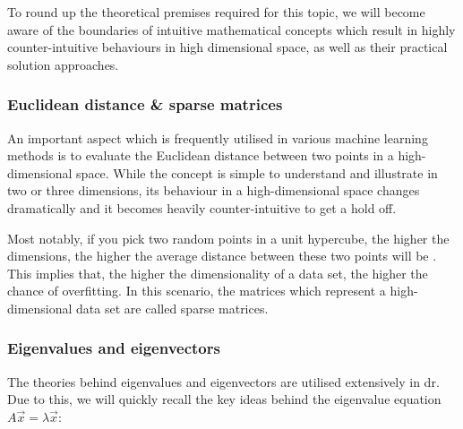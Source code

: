 
To round up the theoretical premises required for this topic, we will become aware of the boundaries of intuitive mathematical concepts which result in highly counter-intuitive behaviours in high dimensional space, as well as their practical solution approaches.

\subsubsection{Euclidean distance \& sparse matrices}

An important aspect which is frequently utilised in various machine learning methods is to evaluate the Euclidean distance between two points in a high-dimensional space.
While the concept is simple to understand and illustrate in two or three dimensions, its behaviour in a high-dimensional space changes dramatically and it becomes heavily counter-intuitive to get a hold off.

Most notably, if you pick two random points in a unit hypercube, the higher the dimensions, the higher the average distance between these two points will be \cite{HandsOnMLCh8}.
This implies that, the higher the dimensionality of a data set, the higher the chance of overfitting.
In this scenario, the matrices which represent a high-dimensional data set are called sparse matrices.

\vspace{2mm}



\subsubsection{Eigenvalues and eigenvectors}

The theories behind eigenvalues and eigenvectors are utilised extensively in \acrlong{dr}.
Due to this, we will quickly recall the key ideas behind the eigenvalue equation $A \overrightarrow{x} = \lambda \overrightarrow{x}$:


